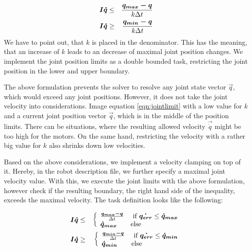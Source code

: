 \begin{eqnarray}\label{eqn:jointlimit}
\vec{I} \vec{\dot{q}} &\leq& \frac{\vec{q_{max}-q}}{k \Delta t}  \notag \\
\vec{I} \vec{\dot{q}} &\geq& \frac{\vec{q_{min}-q}}{k \Delta t}
\end{eqnarray}
We have to point out, that $k$ is placed in the denominator. This has the meaning, that an increase of $k$ leads to an decrease of maximal joint position changes. We implement the joint position limits as a double bounded task, restricting the joint position in the lower and upper boundary. 

The above formulation prevents the solver to resolve any joint state vector $\vec{q}$, which would exceed any joint positions. However, it does not take the joint velocity into considerations. Image equation \ref{eqn:jointlimit} with a low value for $k$ and a current joint position vector $\vec{q}$, which is in the middle of the position limits. There can be situations, where the resulting allowed velocity $\vec{\dot{q}}$ might be too high for the motors. On the same hand, restricting the velocity with a rather big value for $k$ also shrinks down low velocities.

Based on the above considerations, we implement a velocity clamping on top of it. Hereby, in the robot description file, we further specify a maximal joint velocity value. With this, we execute the joint limits with the above formulation, however check if the resulting boundary, the right hand side of the inequality, exceeds the maximal velocity. The task definition looks like the following:

\begin{eqnarray}
\vec{I} \vec{\dot{q}} &\leq& \left\{
\begin{array}{l l}
\frac{\vec{q_{max}-q}}{\Delta t}  & \text{ if } \vec{\dot{q_{err}}}\leq \vec{\dot{q}_{max}} \\
\vec{\dot{q}_{max}} & \text{else}
\end{array} \right. \notag \\
\vec{I} \vec{\dot{q}} &\geq& \left\{
\begin{array}{l l}
\frac{\vec{q_{min}-q}}{\Delta t}  & \text{ if } \vec{\dot{q_{err}}}\leq \vec{\dot{q}_{min}} \\
\vec{\dot{q}_{min}} & \text{else}
\end{array} \right.
\end{eqnarray}
\newpage
